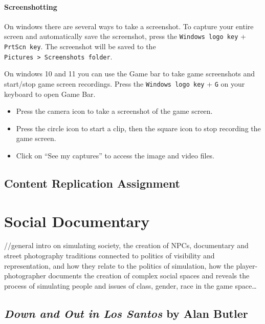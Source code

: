 \documentclass[
  openany]{book}
\begin{document}
\hypertarget{screenshotting}{%
\subsubsection*{Screenshotting}\label{screenshotting}}

On windows there are several ways to take a screenshot. To capture your entire screen and automatically save the screenshot, press the \texttt{Windows\ logo\ key} + \texttt{PrtScn\ key}. The screenshot will be saved to the \texttt{Pictures\ \textgreater{}\ Screenshots\ folder}.

On windows 10 and 11 you can use the Game bar to take game screenshots and start/stop game screen recordings. Press the \texttt{Windows\ logo\ key} + \texttt{G} on your keyboard to open Game Bar.

\begin{itemize}
\item
  Press the camera icon to take a screenshot of the game screen.
\item
  Press the circle icon to start a clip, then the square icon to stop recording the game screen.
\item
  Click on ``See my captures'' to access the image and video files.
\end{itemize}

\hypertarget{content-replication-assignment}{%
\section*{Content Replication Assignment}\label{content-replication-assignment}}

\hypertarget{social-documentary}{%
\chapter{Social Documentary}\label{social-documentary}}

//general intro on simulating society, the creation of NPCs, documentary and street photography traditions connected to politics of visibility and representation, and how they relate to the politics of simulation, how the player-photographer documents the creation of complex social spaces and reveals the process of simulating people and issues of class, gender, race in the game space\ldots{}

\hypertarget{down-and-out-in-los-santos-by-alan-butler}{%
\section*{\texorpdfstring{\emph{Down and Out in Los Santos} by Alan Butler}{Down and Out in Los Santos by Alan Butler}}\label{down-and-out-in-los-santos-by-alan-butler}}
\end{document}
